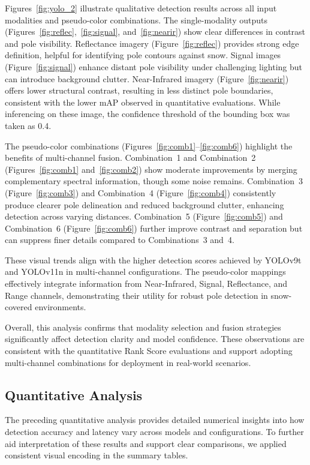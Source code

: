 \documentclass[runningheads]{llncs}
\begin{document}
Figures~\ref{fig:yolo_2} illustrate qualitative detection results across all input modalities and pseudo-color combinations. The single-modality outputs (Figures~\ref{fig:reflec},~\ref{fig:signal}, and~\ref{fig:nearir}) show clear differences in contrast and pole visibility. Reflectance imagery (Figure~\ref{fig:reflec}) provides strong edge definition, helpful for identifying pole contours against snow. Signal images (Figure~\ref{fig:signal}) enhance distant pole visibility under challenging lighting but can introduce background clutter. Near-Infrared imagery (Figure~\ref{fig:nearir}) offers lower structural contrast, resulting in less distinct pole boundaries, consistent with the lower mAP observed in quantitative evaluations. While inferencing on these image, the confidence threshold of the bounding box was taken as 0.4.

The pseudo-color combinations (Figures~\ref{fig:comb1}--\ref{fig:comb6}) highlight the benefits of multi-channel fusion. Combination~1 and Combination~2 (Figures~\ref{fig:comb1} and~\ref{fig:comb2}) show moderate improvements by merging complementary spectral information, though some noise remains. Combination~3 (Figure~\ref{fig:comb3}) and Combination~4 (Figure~\ref{fig:comb4}) consistently produce clearer pole delineation and reduced background clutter, enhancing detection across varying distances. Combination~5 (Figure~\ref{fig:comb5}) and Combination~6 (Figure~\ref{fig:comb6}) further improve contrast and separation but can suppress finer details compared to Combinations~3 and~4.

These visual trends align with the higher detection scores achieved by YOLOv9t and YOLOv11n in multi-channel configurations. The pseudo-color mappings effectively integrate information from Near-Infrared, Signal, Reflectance, and Range channels, demonstrating their utility for robust pole detection in snow-covered environments.

Overall, this analysis confirms that modality selection and fusion strategies significantly affect detection clarity and model confidence. These observations are consistent with the quantitative Rank Score evaluations and support adopting multi-channel combinations for deployment in real-world scenarios.





\subsection{Quantitative Analysis}
The preceding quantitative analysis provides detailed numerical insights into how detection accuracy and latency vary across models and configurations. To further aid interpretation of these results and support clear comparisons, we applied consistent visual encoding in the summary tables.
\end{document}
